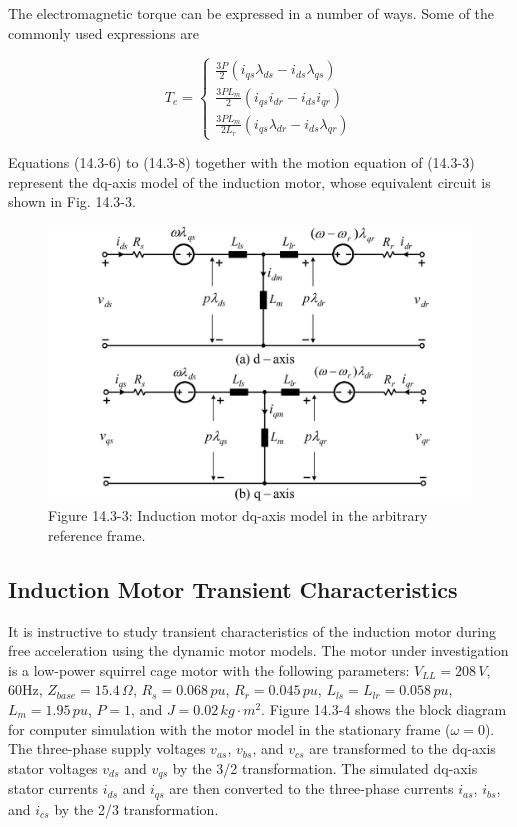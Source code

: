 \documentclass[letterpaper,12pt]{article}
\begin{document}
The electromagnetic torque can be expressed in a number of ways. Some of the commonly used expressions are

\begin{equation}
T_e = \left\{
\begin{array}{l}
\frac{3P}{2}(i_{qs}\lambda_{ds} - i_{ds}\lambda_{qs}) \\
\frac{3PL_m}{2}(i_{qs}i_{dr} - i_{ds}i_{qr}) \\
\frac{3PL_m}{2L_r}(i_{qs}\lambda_{dr} - i_{ds}\lambda_{qr})
\end{array} \tag{14.3-8}
\right.
\end{equation}

Equations (14.3-6) to (14.3-8) together with the motion equation of (14.3-3) represent the dq-axis model of the induction motor, whose equivalent circuit is shown in Fig. 14.3-3.

\begin{figure}[h]
\centering
\includegraphics{graficos/img05.jpg}
\caption{Figure 14.3-3: Induction motor dq-axis model in the arbitrary reference frame.}
\end{figure}
\FloatBarrier

\subsection{Induction Motor Transient Characteristics}

It is instructive to study transient characteristics of the induction motor during free acceleration using the dynamic motor models. The motor under investigation is a low-power squirrel cage motor with the following parameters: $V_{LL} = 208 \, V$, 60Hz, $Z_{base} = 15.4 \, \Omega$, $R_s = 0.068 \, pu$, $R_r = 0.045 \, pu$, $L_{ls} = L_{lr} = 0.058 \, pu$, $L_m = 1.95 \, pu$, $P = 1$, and $J = 0.02 \, kg\cdot m^2$. Figure 14.3-4 shows the block diagram for computer simulation with the motor model in the stationary frame ($\omega = 0$). The three-phase supply voltages $v_{as}$, $v_{bs}$, and $v_{cs}$ are transformed to the dq-axis stator voltages $v_{ds}$ and $v_{qs}$ by the 3/2 transformation. The simulated dq-axis stator currents $i_{ds}$ and $i_{qs}$ are then converted to the three-phase currents $i_{as}$, $i_{bs}$, and $i_{cs}$ by the 2/3 transformation.
\end{document}
